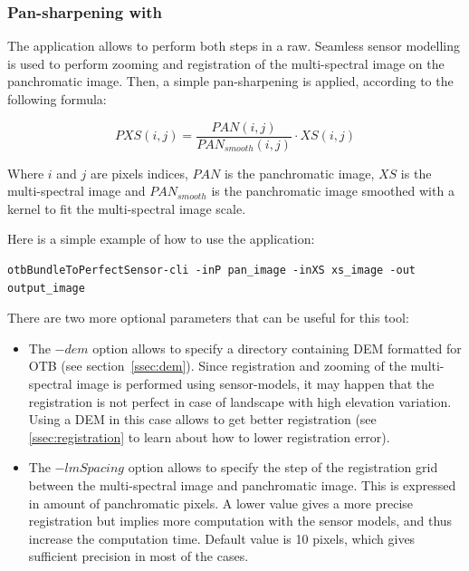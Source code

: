 \subsubsection{Pan-sharpening with \app}

The  application allows to
perform both steps in a raw. Seamless sensor modelling is used to
perform zooming and registration of the multi-spectral image on the
panchromatic image. Then, a simple pan-sharpening is applied,
according to the following formula:

\begin{equation}
PXS(i,j) = \frac{PAN(i,j)}{PAN_{smooth}(i,j)} \cdot XS(i,j)
\end{equation}

Where $i$ and $j$ are pixels indices, $PAN$ is the panchromatic image,
$XS$ is the multi-spectral image and $PAN_{smooth}$ is the
panchromatic image smoothed with a kernel to fit the multi-spectral
image scale.

Here is a simple example of how to use the
 application:

\begin{verbatim}
otbBundleToPerfectSensor-cli -inP pan_image -inXS xs_image -out output_image
\end{verbatim}

There are two more optional parameters that can be useful for this
tool:
\begin{itemize}
\item The $-dem$ option allows to specify a directory containing DEM
  formatted for OTB (see section~\ref{ssec:dem}). Since registration
  and zooming of the multi-spectral image is performed using
  sensor-models, it may happen that the registration is not perfect in
  case of landscape with high elevation variation. Using a DEM in this
  case allows to get better registration (see \ref{ssec:registration}
  to learn about how to lower registration error).
\item The $-lmSpacing$ option allows to specify the step of the
  registration grid between the multi-spectral image and panchromatic
  image. This is expressed in amount of panchromatic pixels. A lower
  value gives a more precise registration but implies more computation
  with the sensor models, and thus increase the computation
  time. Default value is 10 pixels, which gives sufficient precision
  in most of the cases.
\end{itemize}

